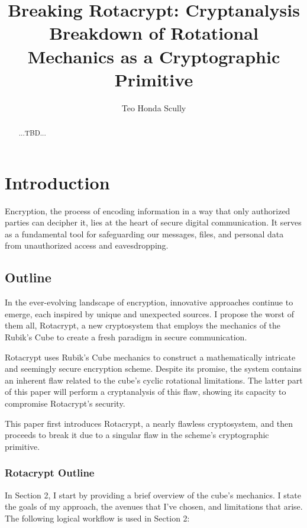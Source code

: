 \documentclass[12pt]{article}
\title{Breaking Rotacrypt: Cryptanalysis Breakdown of Rotational Mechanics as a Cryptographic Primitive}
\author{Teo Honda Scully}
\date{}
\begin{document}
\maketitle

\begin{abstract}
...TBD...
\end{abstract}

\tableofcontents

\newpage

\section{Introduction}

Encryption, the process of encoding information in a way that only authorized parties can decipher it, lies at the heart of secure digital communication. It serves as a fundamental tool for safeguarding our messages, files, and personal data from unauthorized access and eavesdropping.

\subsection{Outline}

In the ever-evolving landscape of encryption, innovative approaches continue to emerge, each inspired by unique and unexpected sources. I propose the worst of them all, Rotacrypt, a new cryptosystem that employs the mechanics of the Rubik's Cube to create a fresh paradigm in secure communication.

Rotacrypt uses Rubik's Cube mechanics to construct a mathematically intricate and seemingly secure encryption scheme. Despite its promise, the system contains an inherent flaw related to the cube's cyclic rotational limitations. The latter part of this paper will perform a cryptanalysis of this flaw, showing its capacity to compromise Rotacrypt's security.

This paper first introduces Rotacrypt, a nearly flawless cryptosystem, and then proceeds to break it due to a singular flaw in the scheme's cryptographic primitive.

\subsubsection{Rotacrypt Outline}

In Section 2, I start by providing a brief overview of the cube's mechanics. I state the goals of my approach, the avenues that I've chosen, and limitations that arise. The following logical workflow is used in Section 2:
\end{document}
